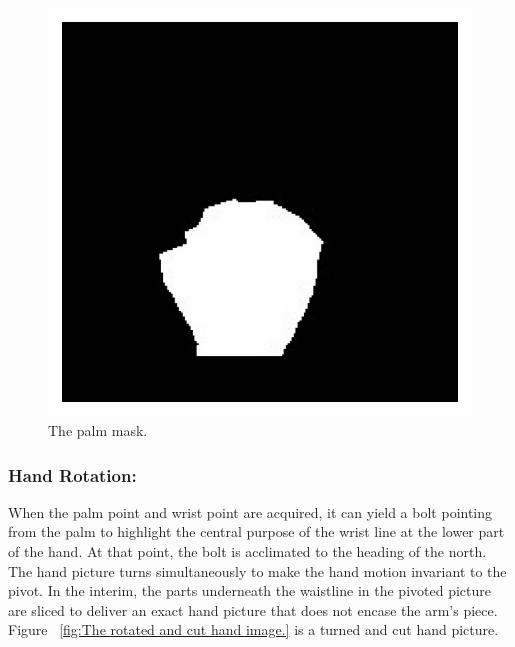 \documentclass[a4paper]{article}
\begin{document}
\begin{figure}[h!]
 \begin{center}
  \includegraphics[scale=1.7]{fig6}
  \caption{The palm mask.}
  \label{fig:The palm mask.}
 \end{center}
\end{figure}



\subsubsection{Hand Rotation:} 
When the palm point and wrist point are acquired, it can yield a bolt pointing from the palm to highlight the central purpose of the wrist line at the lower part of the hand. At that point, the bolt is acclimated to the heading of the north. The hand picture turns simultaneously to make the hand motion invariant to the pivot. In the interim, the parts underneath the waistline in the pivoted picture are sliced to deliver an exact hand picture that does not encase the arm's piece. Figure ~\ref{fig:The rotated and cut hand image.} is a turned and cut hand picture.
\end{document}
